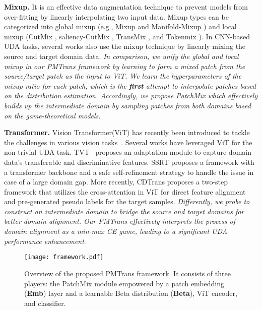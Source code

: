 \documentclass[10pt,twocolumn,letterpaper, ]{article}
\begin{document}
\noindent\textbf{Mixup.}
It is an effective data augmentation technique to prevent models from over-fitting by linearly interpolating two input data. Mixup types can be categorized into global mixup (e.g., Mixup \cite{ZhangCDL18} and Manifold-Mixup \cite{VermaLBNMLB19}) and local mixup (CutMix \cite{YunHCOYC19}, saliency-CutMix \cite{UddinMSCB21}, TransMix \cite{DBLP:journals/corr/abs-2111-09833}, and Tokenmix \cite{LiuLZ0022}). In CNN-based UDA tasks, several works \cite{XuZNLWTZ20, WuIE20, NaJCH21, Dai00T0D21} also use the mixup technique by linearly mixing the source and target domain data. \textit{In comparison, we unify the global and local mixup in our PMTrans framework by learning to form a mixed patch from the source/target patch as the input to ViT. We learn the hyperparameters of the mixup ratio for each patch, which is the \textbf{first} attempt to interpolate patches based on the distribution estimation. Accordingly, we propose PatchMix which effectively builds up the intermediate domain by sampling patches from both domains based on the game-theoretical models.}

\noindent\textbf{Transformer.} Vision Transformer(ViT) \cite{VaswaniSPUJGKP17} has recently been introduced to tackle the challenges in various vision tasks~\cite{CaronTMJMBJ21, LiuL00W0LG21}. Several works have leveraged ViT for the non-trivial UDA task. TVT~\cite{abs-2108-05988} proposes an adaptation module to capture domain data's transferable and discriminative features. SSRT \cite{abs-2204-07683} proposes a framework with a transformer backbone and a safe self-refinement strategy to handle the issue in case of a large domain gap. More recently, CDTrans \cite{abs-2109-06165} proposes a two-step framework that utilizes the cross-attention in ViT for direct feature alignment and pre-generated pseudo labels for the target samples. \textit{Differently, we probe to construct an intermediate domain to bridge the source and target domains for better domain alignment. Our PMTrans effectively interprets the process of domain alignment as
a min-max CE game, leading to a significant UDA performance enhancement}. 


\begin{figure*}[t!]
    \centering
    
    \texttt{[image: framework.pdf]}
    \captionsetup{font=small}
    \vspace{-10pt}
    \caption{Overview of the proposed PMTrans framework. It consists of three players:
the PatchMix module empowered by a patch embedding (\textbf{Emb}) layer and a learnable Beta distribution (\textbf{Beta}), ViT encoder, and classifier. 
    }
    \label{fig:framework}
    \vspace{-15pt}
\end{figure*}
\end{document}
